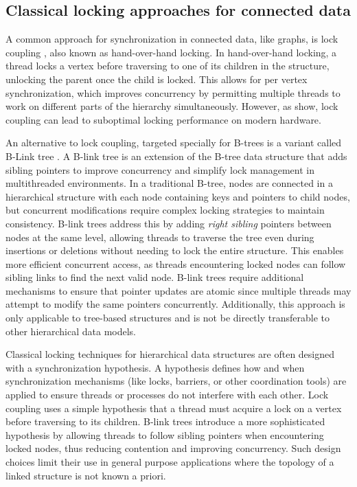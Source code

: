 \subsection{Classical locking approaches for connected data}
A common approach for synchronization in connected data, like graphs, is lock coupling \cite{DBLP:journals/acta/BayerS77}, also known as hand-over-hand locking. In hand-over-hand locking, a thread locks a vertex before traversing to one of its children in the structure, unlocking the parent once the child is locked. 
This allows for per vertex synchronization, which improves concurrency by permitting multiple threads to work on different parts of the hierarchy simultaneously. 
However, as \citet{LeisH019} show, lock coupling can lead to suboptimal locking performance on modern hardware. 


An alternative to lock coupling, targeted specially for B-trees is a variant called B-Link tree \cite{LehmanY81}. A B-link tree is an extension of the B-tree data structure that adds sibling pointers to improve concurrency and simplify lock management in multithreaded environments. In a traditional B-tree, nodes are connected in a hierarchical structure with each node containing keys and pointers to child nodes, but concurrent modifications require complex locking strategies to maintain consistency. B-link trees address this by adding \emph{right sibling} pointers between nodes at the same level, allowing threads to traverse the tree even during insertions or deletions without needing to lock the entire structure. This enables more efficient concurrent access, as threads encountering locked nodes can follow sibling links to find the next valid node. B-link trees require additional mechanisms to ensure that pointer updates are atomic since multiple threads may attempt to modify the same pointers concurrently. Additionally, this approach is only applicable to tree-based structures and is not be directly transferable to other hierarchical data models.


Classical locking techniques for hierarchical data structures are often designed with a synchronization hypothesis. A hypothesis defines how and when synchronization mechanisms (like locks, barriers, or other coordination tools) are applied to ensure threads or processes do not interfere with each other. Lock coupling uses a simple hypothesis that a thread must acquire a lock on a vertex before traversing to its children. B-link trees introduce a more sophisticated hypothesis by allowing threads to follow sibling pointers when encountering locked nodes, thus reducing contention and improving concurrency. Such design choices limit their use in general purpose applications where the topology of a linked structure is not known a priori. 

